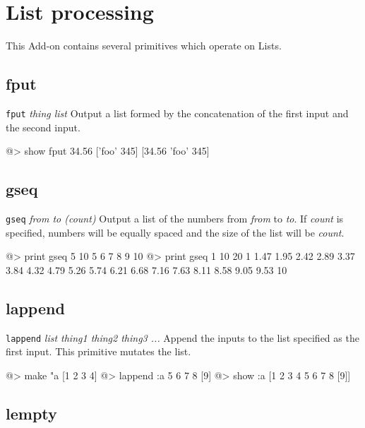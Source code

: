 
\section{List processing} 

This Add-on contains several primitives which operate on Lists.

\subsection*{fput}  
 
{\tt fput} {\it thing list} 
\newline\newline 
Output a list formed by the concatenation of the first input and the second input.
\begin{verbatimtab} 
@> show fput 34.56 ['foo' 345]
[34.56 'foo' 345]
\end{verbatimtab}

\subsection*{gseq}  
 
{\tt gseq} {\it from to (count)} 
\newline\newline 
Output a list of the numbers from {\it from} to {\it to}. If {\it count} is specified, numbers will be equally spaced and the size of the list will be {\it count}.
\begin{verbatimtab} 
@> print gseq 5 10
5 6 7 8 9 10
@> print gseq 1 10 20
1 1.47 1.95 2.42 2.89 3.37 3.84 4.32 4.79 5.26
5.74 6.21 6.68 7.16 7.63 8.11 8.58 9.05 9.53 10
\end{verbatimtab}

\subsection*{lappend}  
 
{\tt lappend} {\it list thing1 thing2 thing3 ...} 
\newline\newline 
Append the inputs to the list specified as the first input. This primitive mutates the list.
\begin{verbatimtab} 
@> make "a [1 2 3 4]
@> lappend :a 5 6 7 8 [9]
@> show :a
[1 2 3 4 5 6 7 8 [9]]
\end{verbatimtab} 

\subsection*{lempty}  
 
